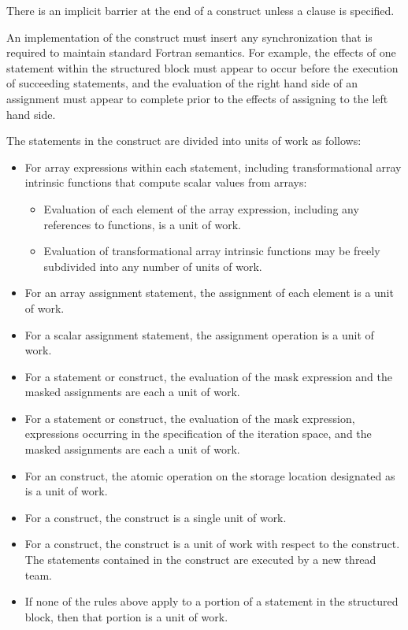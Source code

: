 \begin{fortranspecific}
\descr
There is an implicit barrier at the end of a  construct 
unless a  clause is specified.

An implementation of the  construct must insert any synchronization 
that is required to maintain standard Fortran semantics. For example, the effects 
of one statement within the structured block must appear to occur before the 
execution of succeeding statements, and the evaluation of the right hand side of 
an assignment must appear to complete prior to the effects of assigning to the left 
hand side. 

The statements in the  construct are divided into units of work 
as follows:

\begin{itemize}
\item For array expressions within each statement, including transformational 
      array intrinsic functions that compute scalar values from arrays:

\begin{itemize}
\item Evaluation of each element of the array expression, including any 
      references to  functions, is a unit of work.
\item Evaluation of transformational array intrinsic functions may be freely
      subdivided into any number of units of work.
\end{itemize}

\item For an array assignment statement, the assignment of each element is 
      a unit of work.
\item For a scalar assignment statement, the assignment operation is a unit of work.
\item For a  statement or construct, the evaluation of the mask 
      expression and the masked assignments are each a unit of work.
\item For a  statement or construct, the evaluation of the mask 
      expression, expressions occurring in the specification of the iteration 
      space, and the masked assignments are each a unit of work.
\item For an  construct, the atomic operation on the storage 
      location designated as  is a unit of work.
\item For a  construct, the construct is a single unit of work.
\item For a  construct, the construct is a unit of work with 
      respect to the  construct. The statements contained in 
      the  construct are executed by a new thread team.
\item If none of the rules above apply to a portion of a statement in the 
      structured block, then that portion is a unit of work.
\end{itemize}


\end{fortranspecific}
